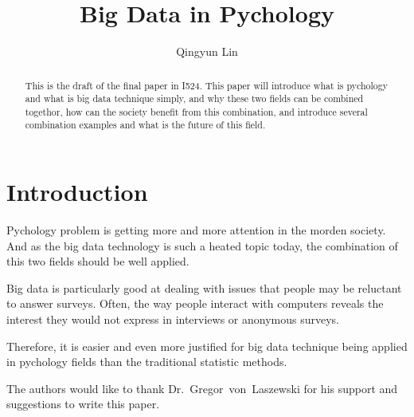 

\title{Big Data in Pychology}


\author{Qingyun Lin}


\renewcommand{\shortauthors}{G. v. Laszewski}


\begin{abstract}
This is the draft of the final paper in I524. This paper will 
introduce what is pychology and what is big data technique simply, 
and why these two fields can be combined togethor, how can the 
society benefit from this combination, and introduce several 
combination examples and what is the future of this field.
\end{abstract}



\maketitle

\section{Introduction}

Pychology problem is getting more and more attention in the morden 
society. And as the big data technology is such a heated topic today, 
the combination of this two fields should be well applied.

Big data is particularly good at dealing with issues that people may 
be reluctant to answer surveys. Often, the way people interact with 
computers reveals the interest they would not express in interviews 
or anonymous surveys\cite{hid-sp18-515-editor00}.

Therefore, it is easier and even more justified for big data technique 
being applied in pychology fields than the traditional statistic methods.

\begin{acks}

  The authors would like to thank Dr.~Gregor~von~Laszewski for his
  support and suggestions to write this paper.

\end{acks}



 

